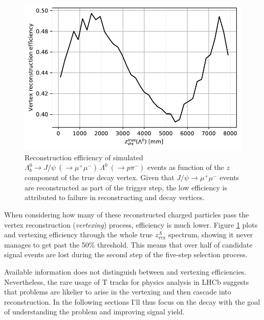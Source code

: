 \begin{figure}[t!]
	\centering
	\includegraphics[width=.6\textwidth]{graphics/03-vertex_reconstruction/lambda_lambdab_reco_efficiency.pdf}
	\caption[A]{Reconstruction efficiency of simulated $\Lambda^0_b \rightarrow J/\psi~(\rightarrow \mu^+\mu^-)~\Lambda^0~(\rightarrow p\pi^-)$ events as function of the $z$ component of the true \lz decay vertex. Given that $J/\psi \rightarrow \mu^+ \mu^-$ events are reconstructed as part of the trigger step, the low efficiency is attributed to failure in reconstructing \lz and \lbz decay vertices.}
	\label{fig:lambda_lambdab_reco_efficiency}
\end{figure}

When considering how many of these reconstructed charged particles pass the vertex reconstruction (\textit{vertexing}) process, efficiency is much lower.
Figure \ref{fig:lambda_lambdab_reco_efficiency} plots \lbz and \lz vertexing efficiency through the whole true $z_\text{vtx}^\Lambda$ spectrum, showing it never manages to get past the 50\% threshold.
This means that over half of candidate signal events are lost during the second step of the five-step selection process.

Available information does not distinguish between \demonstratorshort and \lambdadecay vertexing efficiencies.
Nevertheless, the rare usage of T tracks for physics analysis in LHCb suggests that problems are likelier to arise in the \lambdadecay vertexing and then cascade into \demonstratorshort reconstruction.
In the following sections I'll thus focus on the \lambdadecay decay with the goal of understanding the problem and improving signal yield.



